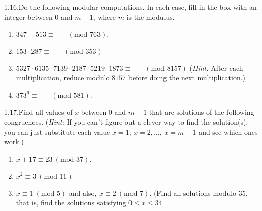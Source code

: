 \begin{exercise}
    {1.16.}Do the following modular computations. In each case, fill in the box with an integer between 0 and $m - 1$, where $m$ is the modulus.
    \begin{enumerate}
        \item $347 + 513 \equiv \boxed{\phantom{000}} \ (\text{mod } 763)$.
        \setcounter{enumi}{2}
        \item $153 \cdot 287 \equiv \boxed{\phantom{000}} \ (\text{mod } 353)$
        \setcounter{enumi}{4}
        \item $5327 \cdot 6135 \cdot 7139 \cdot 2187 \cdot 5219 \cdot 1873 \equiv \boxed{\phantom{000}} \ (\text{mod } 8157)$ (\textit{Hint:} After each multiplication, reduce modulo $8157$ before doing the next multiplication.)
        \setcounter{enumi}{6}
        \item $373^6 \equiv \boxed{\phantom{000}} \ (\text{mod } 581)$.
    \end{enumerate}
\end{exercise}


\begin{exercise}
    {1.17.}Find all values of $x$ between $0$ and $m - 1$ that are solutions of the following congruences. (\textit{Hint:} If you can’t figure out a clever way to find the solution(s), you can just substitute each value $x = 1$, $x = 2,\dots$, $x = m - 1$ and see which ones work.)
    \begin{enumerate}
        \item $x + 17 \equiv 23 \ (\text{mod } 37)$.
        \setcounter{enumi}{2}
        \item $x^2 \equiv 3 \ (\text{mod } 11)$
        \setcounter{enumi}{6}
        \item $x \equiv 1 \ (\text{mod } 5)$ and also, $x \equiv 2 \ (\text{mod } 7)$. (Find all solutions modulo 35, that is, find the solutions satisfying $0 \leq x \leq 34$.
    \end{enumerate}
\end{exercise}

